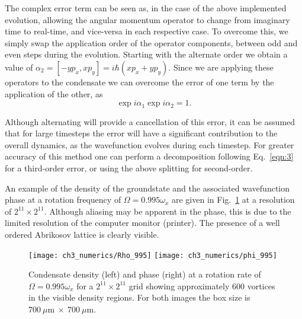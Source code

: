  The complex error term can be seen as, in the case of the above implemented evolution, allowing the angular momentum operator to change from imaginary time to real-time, and vice-versa in each respective case. To overcome this, we simply swap the application order of the operator components, between odd and even steps during the evolution. Starting with the alternate order we obtain a value of $\alpha_2 = [-y p_x, x p_y] = i\hbar \left(x p_x + y p_y \right)$. Since we are applying these operators to the condensate we can overcome the error of one term by the application of the other, as
 \begin{equation}
 \exp{i \alpha_1}\exp{i \alpha_2} = 1.
 \end{equation}

 Although alternating will provide a cancellation of this error, it can be assumed that for large timesteps the error will have a significant contribution to the overall dynamics, as the wavefunction evolves during each timestep. For greater accuracy of this method one can perform a decomposition following Eq.~\eqref{eqn:3} for a third-order error, or using the above splitting for second-order.

An example of the density of the groundstate and the associated wavefunction phase at a rotation frequency of $\Omega = 0.995\omega_x$ are given in Fig.~\ref{fig:showingoff} at a resolution of $2^{11}\times 2^{11}$. Although aliasing may be apparent in the phase, this is due to the limited resolution of the computer monitor (printer). The presence of a well ordered Abrikosov lattice is clearly visible.

 \begin{figure}
     \centering
     \texttt{[image: ch3\_numerics/Rho\_995]}
     \texttt{[image: ch3\_numerics/phi\_995]}
     \caption{Condensate density (left) and phase (right) at a rotation rate of $\Omega=0.995\omega_x$ for a $2^{11}\times 2^{11}$ grid showing approximately 600 vortices in the visible density regions. For both images the box size is $700~\mu\textrm{m} ~\times ~700~\mu\textrm{m}$.}
     \label{fig:showingoff}
 \end{figure}

